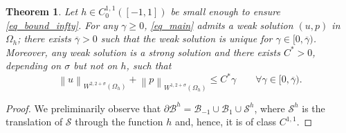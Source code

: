 \documentclass[11pt,a4paper]{amsart}
\newtheorem{theorem}[proposition]{Theorem}
\theoremstyle{remark}
\theoremstyle{definition}
\numberwithin{equation}{section}
\numberwithin{proposition}{section}
\begin{document}
\begin{theorem}\label{the_ex_regu}Let $h\in C_0^{1,1}([-1,1])$ be small enough to ensure \eqref{eq_bound_infty}. For any $\gamma\geq0$, \eqref{eq_main} admits a weak solution $(u, p)$ in $\Omega_h$; there exists $\overline{\gamma}>0$ such that the weak solution is unique for $\gamma\in [0, \overline{\gamma})$. Moreover, any weak solution is a strong solution and there exists $C^*>0$, depending on $\sigma$ but not on $h$, such that
\begin{equation}\label{reg-est}
\left\|u\right\|_{W^{2,2+\sigma }(\Omega_h)}+\left\|p\right\|_{W^{1,2+\sigma}(\Omega_h)}\le C^*\gamma \qquad \forall  \gamma\in[0, \overline{\gamma}).
\end{equation}
\end{theorem}
\begin{proof}
We preliminarily observe that $\partial\mathcal{B}^h=\mathcal{B}_{-1}\cup \mathcal{B}_1\cup\mathcal{S}^h$, where $\mathcal{S}^h$ is the translation of $\mathcal{S}$ through the function $h$ and, hence, it is of class $C^{1,1}$.


\end{proof}
\end{document}

